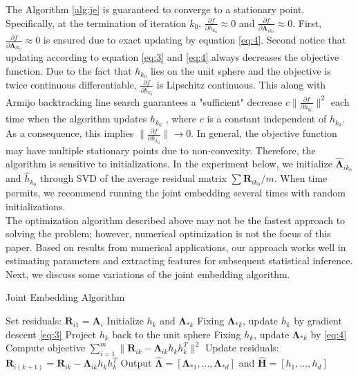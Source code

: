 \documentclass[10pt,journal,compsoc]{IEEEtran}
\newcommand{\bA}{\mathbf{A}}
\newcommand{\bH}{\mathbf{H}}
\newcommand{\bR}{\mathbf{R}}
\newcommand{\bLambda}{\mathbf{\Lambda}}
\begin{document}
\noindent The Algorithm \ref{alg:je} is guaranteed to converge to a stationary point. Specifically, at the termination of iteration $k_0$, $\frac{\partial f}{\partial h_{k_0}} \approx 0$ and $\frac{\partial f}{\partial \bLambda_{i k_0}} \approx 0$. First, $\frac{\partial f}{\partial \bLambda_{i k_0}} \approx 0$ is ensured due to exact updating by equation \eqref{eq:4}. Second notice that updating according to equation \eqref{eq:3} and \eqref{eq:4} always decreases the objective function. Due to the fact that $h_{k_0}$ lies on the unit sphere and the objective is twice continuous differentiable, $\frac{\partial f}{\partial h_{k_0}}$ is Lipschitz continuous. This along with Armijo backtracking line search guarantees a "sufficient" decrease $c\|\frac{\partial f}{\partial h_{k_0}}\|^2$ each time when the algorithm updates $h_{k_0}$ \cite{nocedal2006numerical}, where $c$ is a constant independent of $h_{k_0}$. As a consequence, this implies $\|\frac{\partial f}{\partial h_{k_0}}\| \rightarrow 0$. In general, the objective function may have multiple stationary points due to non-convexity. Therefore, the algorithm is sensitive to initializations. In the experiment below, we initialize $\hat{\bLambda}_{i k_0}$ and $\hat {h}_{k_0}$ through SVD of the average residual matrix $\sum \bR_{ik_0}/m$. When time permits, we recommend running the joint embedding several times with random initializations.\\

\noindent The optimization algorithm described above may not be the fastest approach to solving the problem; however, numerical optimization is not the focus of this paper. Based on results from numerical applications, our approach works well in estimating parameters and extracting features for subsequent statistical inference. Next, we discuss some variations of the joint embedding algorithm.
\begin{algorithm}
	\caption{Joint Embedding Algorithm}
	\label{alg:je}
	\begin{algorithmic}[1]
		\Procedure{Find joint embedding $\hat{\bLambda},\hat{\bH}$ of $\{\bA_i\}_{i=1}^m$}{}
		\State Set residuals: $\bR_{i1}=\bA_i$
		\State Initialize $h_k$ and $\bLambda_{*k}$ 
		\State Fixing $\bLambda_{*k}$, update $h_k$ by gradient descent \eqref{eq:3}
		\State Project $h_k$ back to the unit sphere
		\State Fixing $h_k$, update $\bLambda_{*k}$ by \eqref{eq:4}
		\State Compute objective $\sum\limits_{i=1}^{m} \| \bR_{ik}-  \bLambda_{ik} h_k h_k^T \|^2$
		\EndWhile
		\State Update residuals: $\bR_{i(k+1)}=\bR_{ik}- \bLambda_{ik} h_kh_k^T$
		\EndFor
		\State Output $\hat{\bLambda}=[\bLambda_{*1},...,\bLambda_{*d}]$ and $\hat{\bH}=[h_1,...,h_d]$
		\EndProcedure
	\end{algorithmic}
\end{algorithm}
\end{document}
